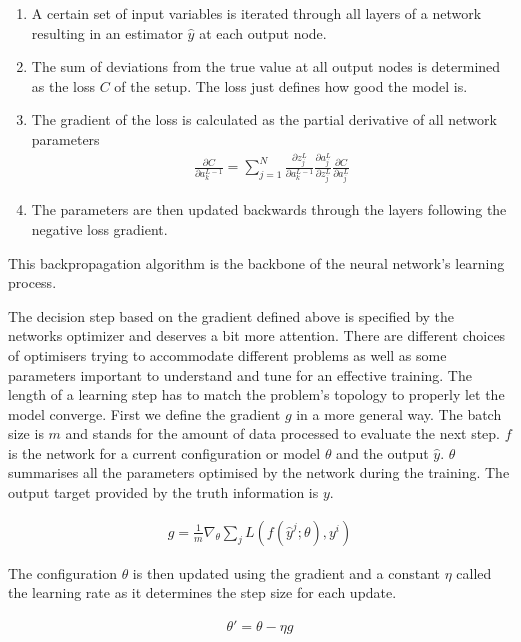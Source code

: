 \begin{enumerate}
    \item A certain set of input variables is iterated through all layers of a network resulting in an estimator $\hat{y}$ at each output node.
    \item The sum of deviations from the true value at all output nodes is determined as the loss $C$ of the setup. The loss just defines how good the model is.
    \item The gradient of the loss is calculated as the partial derivative of all network parameters
    \begin{align*}
        \frac{\partial C}{\partial a_k^{L-1}} = \sum_{j=1}^N \frac{\partial z_j^L}{\partial a_k^{L-1}} \frac{\partial a_j^L}{\partial z_j^L}\frac{\partial C}{\partial a_j^L}
    \end{align*}
    \item The parameters are then updated backwards through the layers following the negative loss gradient.
\end{enumerate}

This backpropagation algorithm is the backbone of the neural network's learning process.

The decision step based on the gradient defined above is specified by the networks optimizer and deserves a bit more attention. There are different choices of optimisers trying to accommodate different problems as well as some parameters important to understand and tune for an effective training. The length of a learning step has to match the problem's topology to properly let the model converge. First we define the gradient $g$ in a more general way. The batch size is $m$ and stands for the amount of data processed to evaluate the next step. $f$ is the network for a current configuration or model $\theta$ and the output $\hat{y}$. $\theta$ summarises all the parameters optimised by the network during the training. The output target provided by the truth information is $y$.

\begin{align}
    g = \frac{1}{m} \nabla_{\theta} \sum_j L(f(\hat{y}^j; \theta), y^i)
\end{align}

The configuration $\theta$ is then updated using the gradient and a constant $\eta$ called the learning rate as it determines the step size for each update.

\begin{align}
    \theta \prime = \theta - \eta g
\end{align}

